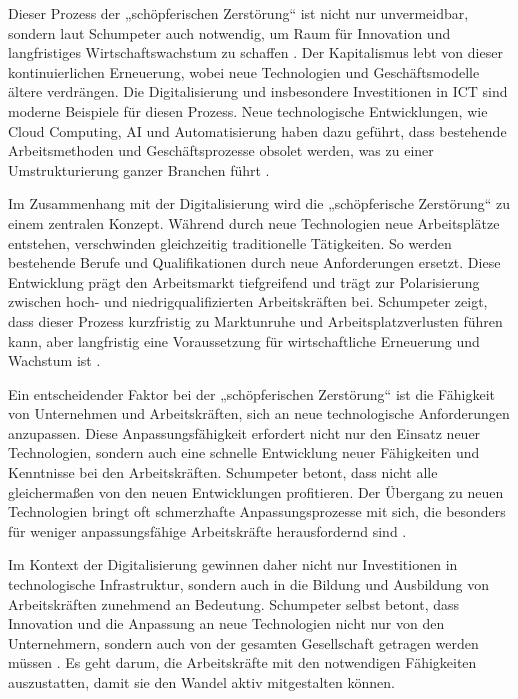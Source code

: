 Dieser Prozess der „schöpferischen Zerstörung“ ist nicht nur unvermeidbar, sondern laut 
Schumpeter auch notwendig, um Raum für Innovation und langfristiges Wirtschaftswachstum zu 
schaffen \parencite[vgl.][S. 87]{schumpeter1976capitalism}. Der Kapitalismus lebt von dieser 
kontinuierlichen Erneuerung, wobei neue Technologien und Geschäftsmodelle ältere verdrängen. 
Die Digitalisierung und insbesondere Investitionen in \ac{ICT} sind moderne Beispiele für 
diesen Prozess. Neue technologische Entwicklungen, wie Cloud Computing, \ac{AI} und 
Automatisierung haben dazu geführt, dass bestehende Arbeitsmethoden und Geschäftsprozesse 
obsolet werden, was zu einer Umstrukturierung ganzer Branchen führt 
\parencite[vgl.][S. 110]{schumpeter1976capitalism}.

Im Zusammenhang mit der Digitalisierung wird die „schöpferische Zerstörung“ zu einem 
zentralen Konzept. Während durch neue Technologien neue Arbeitsplätze entstehen, 
verschwinden gleichzeitig traditionelle Tätigkeiten. So werden bestehende Berufe und 
Qualifikationen durch neue Anforderungen ersetzt. Diese Entwicklung prägt den Arbeitsmarkt 
tiefgreifend und trägt zur Polarisierung zwischen hoch- und niedrigqualifizierten 
Arbeitskräften bei. Schumpeter zeigt, dass dieser Prozess kurzfristig zu Marktunruhe und 
Arbeitsplatzverlusten führen kann, aber langfristig eine Voraussetzung für wirtschaftliche 
Erneuerung und Wachstum ist \parencite[vgl.][S. 110–111]{schumpeter1976capitalism}.

Ein entscheidender Faktor bei der „schöpferischen Zerstörung“ ist die Fähigkeit von 
Unternehmen und Arbeitskräften, sich an neue technologische Anforderungen anzupassen. Diese 
Anpassungsfähigkeit erfordert nicht nur den Einsatz neuer Technologien, sondern auch eine 
schnelle Entwicklung neuer Fähigkeiten und Kenntnisse bei den Arbeitskräften. Schumpeter 
betont, dass nicht alle gleichermaßen von den neuen Entwicklungen profitieren. Der Übergang 
zu neuen Technologien bringt oft schmerzhafte Anpassungsprozesse mit sich, die besonders 
für weniger anpassungsfähige Arbeitskräfte herausfordernd sind 
\parencite[vgl.][S. 110–111]{schumpeter1976capitalism}.

Im Kontext der Digitalisierung gewinnen daher nicht nur Investitionen in technologische 
Infrastruktur, sondern auch in die Bildung und Ausbildung von Arbeitskräften zunehmend an 
Bedeutung. Schumpeter selbst betont, dass Innovation und die Anpassung an neue Technologien 
nicht nur von den Unternehmern, sondern auch von der gesamten Gesellschaft getragen werden 
müssen \parencite[vgl.][S. 132]{schumpeter1976capitalism}. Es geht darum, die Arbeitskräfte 
mit den notwendigen Fähigkeiten auszustatten, damit sie den Wandel aktiv mitgestalten 
können. 

